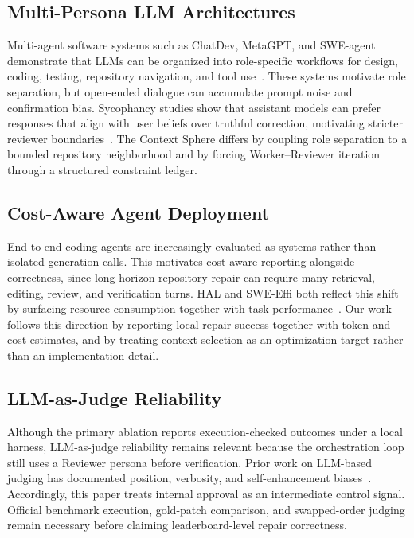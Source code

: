 \subsection{Multi-Persona LLM Architectures}

Multi-agent software systems such as ChatDev, MetaGPT, and SWE-agent demonstrate that LLMs can be organized into role-specific workflows for design, coding, testing, repository navigation, and tool use~\cite{qian2024chatdev,hong2024metagpt,yang2024sweagent}. These systems motivate role separation, but open-ended dialogue can accumulate prompt noise and confirmation bias. Sycophancy studies show that assistant models can prefer responses that align with user beliefs over truthful correction, motivating stricter reviewer boundaries~\cite{sharma2023sycophancy}. The Context Sphere differs by coupling role separation to a bounded repository neighborhood and by forcing Worker--Reviewer iteration through a structured constraint ledger.

\subsection{Cost-Aware Agent Deployment}

End-to-end coding agents are increasingly evaluated as systems rather than isolated generation calls. This motivates cost-aware reporting alongside correctness, since long-horizon repository repair can require many retrieval, editing, review, and verification turns. HAL and SWE-Effi both reflect this shift by surfacing resource consumption together with task performance~\cite{princetonhal2026,fan2025sweeffi}. Our work follows this direction by reporting local repair success together with token and cost estimates, and by treating context selection as an optimization target rather than an implementation detail.

\subsection{LLM-as-Judge Reliability}

Although the primary ablation reports execution-checked outcomes under a local harness, LLM-as-judge reliability remains relevant because the orchestration loop still uses a Reviewer persona before verification. Prior work on LLM-based judging has documented position, verbosity, and self-enhancement biases~\cite{zheng2023judging}. Accordingly, this paper treats internal approval as an intermediate control signal. Official benchmark execution, gold-patch comparison, and swapped-order judging remain necessary before claiming leaderboard-level repair correctness.
